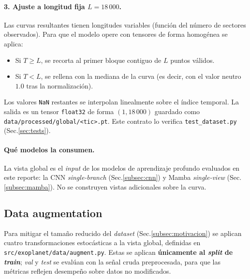\documentclass[11pt,a4paper]{article}
\begin{document}
\paragraph{3. Ajuste a longitud fija $L=18\,000$.}
Las curvas resultantes tienen longitudes variables (función del número
de sectores observados). Para que el modelo opere con tensores de forma
homogénea se aplica:
\begin{itemize}
  \item Si $T \geq L$, se recorta al primer bloque contiguo de $L$
    puntos válidos.
  \item Si $T < L$, se rellena con la mediana de la curva (es decir,
    con el valor neutro $1.0$ tras la normalización).
\end{itemize}
Los valores \texttt{NaN} restantes se interpolan linealmente sobre el
índice temporal. La salida es un tensor \texttt{float32} de forma
$(1, 18\,000)$ guardado como
\texttt{data/processed/global/<tic>.pt}. Este contrato lo verifica
\texttt{test\_dataset.py} (Sec.\ref{sec:tests}).

\paragraph{Qué modelos la consumen.}
La vista global es el \textit{input} de los modelos de aprendizaje
profundo evaluados en este reporte: la CNN \textit{single-branch}
(Sec.\ref{subsec:cnn}) y Mamba \textit{single-view}
(Sec.\ref{subsec:mamba}). No se construyen vistas adicionales sobre la
curva.

\subsection{Data augmentation}
\label{subsec:augmentation}

Para mitigar el tamaño reducido del \textit{dataset}
(Sec.\ref{subsec:motivacion}) se aplican cuatro transformaciones
estocásticas a la vista global, definidas en
\texttt{src/exoplanet/data/augment.py}. Estas se aplican
\textbf{únicamente al \textit{split} de \textit{train}}; \textit{val}
y \textit{test} se evalúan con la señal cruda preprocesada, para que
las métricas reflejen desempeño sobre datos no modificados.
\end{document}
